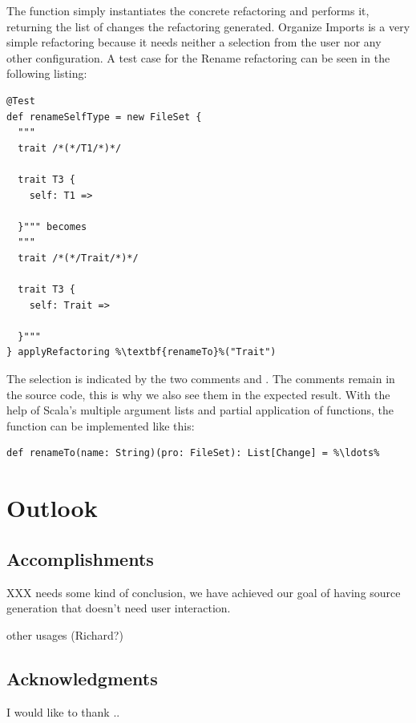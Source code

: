 \documentclass[10pt,a4paper,oneside]{scrreprt}
\begin{document}
The  function simply instantiates the concrete refactoring and performs it, returning the list of changes the refactoring generated. Organize Imports is a very simple refactoring because it needs neither a selection from the user nor any other configuration. A test case for the Rename refactoring can be seen in the following listing:

\begin{lstlisting}
@Test
def renameSelfType = new FileSet {
  """
  trait /*(*/T1/*)*/

  trait T3 {
    self: T1 =>

  }""" becomes
  """
  trait /*(*/Trait/*)*/

  trait T3 {
    self: Trait =>

  }"""
} applyRefactoring %\textbf{renameTo}%("Trait")
\end{lstlisting}

The selection is indicated by the two comments \src{/*(*/} and \src{/*)*/}. The comments remain in the source code, this is why we also see them in the expected result. With the help of Scala's multiple argument lists and partial application of functions, the  function can be implemented like this:

\begin{lstlisting}
def renameTo(name: String)(pro: FileSet): List[Change] = %\ldots%
\end{lstlisting}


\chapter{Outlook} \label{chapter:outlook}

\section{Accomplishments}

XXX needs some kind of conclusion, we have achieved our goal of having source generation that doesn't need user interaction.

other usages (Richard?)


\section{Acknowledgments}

I would like to thank ..
\end{document}
